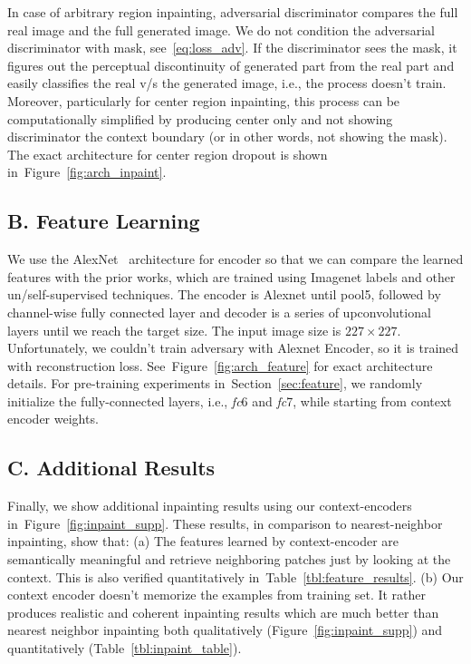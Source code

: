 \documentclass[10pt,twocolumn,letterpaper]{article}
\newcommand{\reffig}[1]{Figure~\ref{fig:#1}}
\newcommand{\refsec}[1]{Section~\ref{sec:#1}}
\newcommand{\reftbl}[1]{Table~\ref{tbl:#1}}
\begin{document}
In case of arbitrary region inpainting, adversarial discriminator compares the full real image and the full generated image. We do not condition the adversarial discriminator with mask, see~\eqref{eq:loss_adv}. If the discriminator sees the mask, it figures out the perceptual discontinuity of generated part from the real part and easily classifies the real v/s the generated image, i.e., the process doesn't train.
Moreover, particularly for center region inpainting, this process can be computationally simplified by producing center only and not showing discriminator the context boundary (or in other words, not showing the mask).
The exact architecture for center region dropout is shown in~\reffig{arch_inpaint}.

\subsection*{B. Feature Learning}
We use the AlexNet~\cite{krizhevsky2012imagenet} architecture for encoder so that we can compare the learned features with the prior works, which are trained using Imagenet labels and other un/self-supervised techniques.
The encoder is Alexnet until pool5, followed by channel-wise fully connected layer and decoder is a series of upconvolutional layers until we reach the target size.
The input image size is $227\times 227$.
Unfortunately, we couldn't train adversary with Alexnet Encoder, so it is trained with reconstruction loss.
See~\reffig{arch_feature} for exact architecture details.
For pre-training experiments in~\refsec{feature}, we randomly initialize the fully-connected layers, i.e., \textit{fc}6 and \textit{fc}7, while starting from context encoder weights.

\subsection*{C. Additional Results}
Finally, we show additional inpainting results using our context-encoders in~\reffig{inpaint_supp}.
These results, in comparison to nearest-neighbor inpainting, show that: (a) The features learned by context-encoder are semantically meaningful and retrieve neighboring patches just by looking at the context. This is also verified quantitatively in~\reftbl{feature_results}. (b) Our context encoder doesn't memorize the examples from training set. It rather produces realistic and coherent inpainting results which are much better than nearest neighbor inpainting both qualitatively (\reffig{inpaint_supp}) and quantitatively (\reftbl{inpaint_table}).
\end{document}
